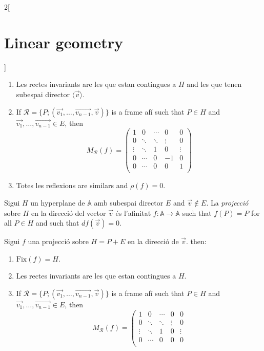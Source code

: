 \documentclass[class=article,10pt,crop=false]{standalone}
\begin{document}
\begin{multicols}{2}[\section{Linear geometry}]
\begin{prop}
\begin{enumerate}
    \item Les rectes invariants are les que estan contingues a $H$ and les que tenen subespai director $\langle\overrightarrow{v}\rangle$.
    \item If $\mathcal{R}=\{P;(\overrightarrow{v_1},\ldots,\overrightarrow{v_{n-1}},\overrightarrow{v})\}$ is a frame afí such that $P\in H$ and $\overrightarrow{v_1},\ldots,\overrightarrow{v_{n-1}}\in E$, then $$M_\mathcal{R}(f)=\left(\begin{array}{cccc|c}
    1 & 0 & \cdots & 0 & 0\\
    0 & \ddots & \ddots & \vdots & 0\\
    \vdots & \ddots & 1 & 0 & \vdots\\
     0&\cdots & 0 & -1 & 0\\
    \hline
    0 & \cdots & 0 & 0 &  1\\
    \end{array}\right)$$
    \item Totes les reflexions are similars and $\rho(f)=0$.
\end{enumerate}
\end{prop}
\begin{definition}[Projeccions]
Sigui $H$ un hyperplane de $\mathbb{A}$ amb subespai director $E$ and $\overrightarrow{v}\notin E$. La \textit{projecció} sobre $H$ en la direcció del vector $\overrightarrow{v}$ és l'afinitat $f:\mathbb{A}\rightarrow\mathbb{A}$ such that $f(P)=P$ for all $P\in H$ and such that $df(\overrightarrow{v})=0$.
\end{definition}
\begin{prop}
Sigui $f$ una projecció sobre $H=P+E$ en la direcció de $\overrightarrow{v}$. then:
\begin{enumerate}
    \item $\text{Fix}(f)=H$.
    \item Les rectes invariants are les que estan contingues a $H$.
    \item If $\mathcal{R}=\{P;(\overrightarrow{v_1},\ldots,\overrightarrow{v_{n-1}},\overrightarrow{v})\}$ is a frame afí such that $P\in H$ and $\overrightarrow{v_1},\ldots,\overrightarrow{v_{n-1}}\in E$, then $$M_\mathcal{R}(f)=\left(\begin{array}{cccc|c}
    1 & 0 & \cdots & 0 & 0\\
    0 & \ddots & \ddots & \vdots & 0\\
    \vdots & \ddots & 1 & 0 & \vdots\\
     0&\cdots & 0 & 0 & 0\\

\end{array}$$
\end{enumerate}
\end{prop}
\end{multicols}
\end{document}
